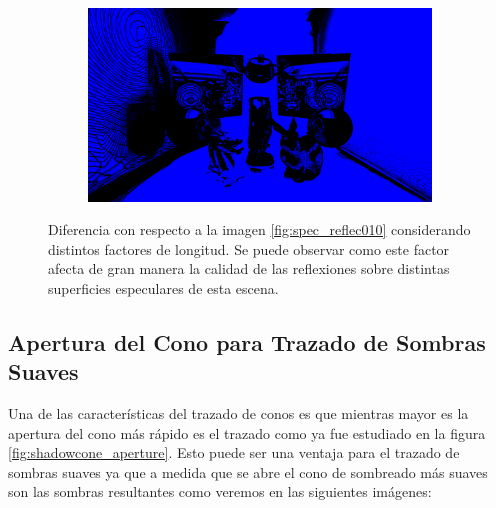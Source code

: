 \begin{figure}[H]
\begin{subfigure}[b]{.49\linewidth}
	\end{subfigure}%
	\hspace{0.01\textwidth}
	\begin{subfigure}[b]{.49\linewidth}
		\centering
		\captionsetup{justification=centering}
		\caption*{}
		\includegraphics[width=\linewidth]{media/finals/test_s250_diff.png}
	\end{subfigure}%
	\caption{Diferencia con respecto a la imagen \ref{fig:spec_reflec010} considerando distintos factores de longitud. Se puede observar como este factor afecta de gran manera la calidad de las reflexiones sobre distintas superficies especulares de esta escena.}
	\label{fig:spec_reflex_comp1}
\end{figure}

\subsection{Apertura del Cono para Trazado de Sombras Suaves}

Una de las características del trazado de conos es que mientras mayor es la apertura del cono más rápido es el trazado como ya fue estudiado en la figura \ref{fig:shadowcone_aperture}. Esto puede ser una ventaja para el trazado de sombras suaves ya que a medida que se abre el cono de sombreado más suaves son las sombras resultantes como veremos en las siguientes imágenes:


